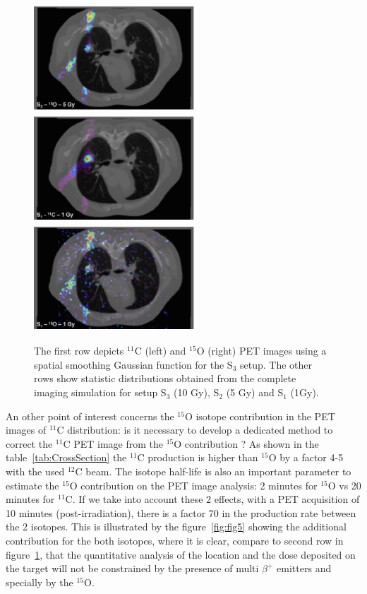 \documentclass[11pt]{iopart}
\begin{document}
\begin{figure}[!h]
  \includegraphics[width=6cm,height=40mm]{figures/O15_5Gy_v1.jpg}
  \includegraphics[width=6cm,height=40mm]{figures/C11_1Gy_v1.jpg}
  \includegraphics[width=6cm,height=40mm]{figures/O15_1Gy_v1.jpg}
  \caption{The first row depicts $^{11}$C (left) and $^{15}$O (right)
    PET images using a spatial smoothing Gaussian function for the
    S$_{3}$ setup. The other rows show statistic distributions
    obtained from the complete imaging simulation for setup S$_{3}$
    (10 Gy), S$_{2}$ (5 Gy) and S$_{1}$ (1Gy).}
  \label{fig:fig3}
\end{figure}

An other point of interest concerns the $^{15}$O isotope contribution
in the PET images of $^{11}$C distribution: is it necessary to develop
a dedicated method to correct the $^{11}$C PET image from the $^{15}$O
contribution ? As shown in the table~\ref{tab:CrossSection} the
$^{11}$C production is higher than $^{15}$O by a factor 4-5 with the
used $^{12}$C beam. The isotope half-life is also an important
parameter to estimate the $^{15}$O contribution on the PET image
analysis: 2 minutes for $^{15}$O vs 20 minutes for $^{11}$C. If we
take into account these 2 effects, with a PET acquisition of 10
minutes (post-irradiation), there is a factor 70 in the production
rate between the 2 isotopes. This is illustrated by the
figure~\ref{fig:fig5} showing the additional contribution for the both
isotopes, where it is clear, compare to second row in
figure~\ref{fig:fig3}, that the quantitative analysis of the location
and the dose deposited on the target will not be constrained by the
presence of multi $\beta^+$ emitters and specially by the $^{15}$O.
\end{document}
